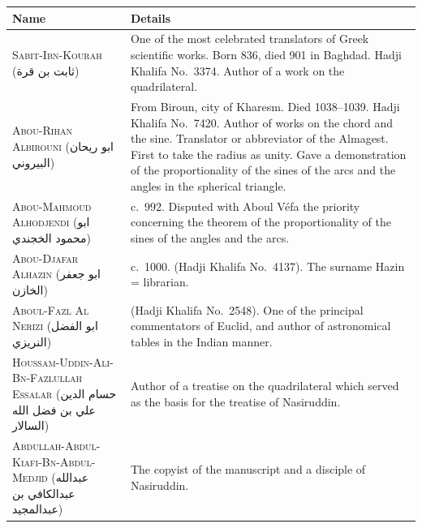 \documentclass[11pt,a4paper]{article}
\theoremstyle{plain}
\theoremstyle{definition}
\theoremstyle{remark}
\newcommand{\ar}[1]{{\arabicfont\beginR #1\endR}}
\begin{document}
\begin{center}
\begin{longtable}{lp{9cm}}
\toprule
\textbf{Name} & \textbf{Details} \\
\midrule
\endhead

\textsc{Sabit-Ibn-Kourah} (\ar{ثابت بن قرة}) & One of the most celebrated translators of Greek scientific works. Born 836, died 901 in Baghdad. Hadji Khalifa No.~3374. Author of a work on the quadrilateral. \\
\addlinespace[0.2cm]

\textsc{Abou-Rihan Albirouni} (\ar{ابو ريحان البيروني}) & From Biroun, city of Kharesm. Died 1038--1039. Hadji Khalifa No.~7420. Author of works on the chord and the sine. Translator or abbreviator of the Almagest. First to take the radius as unity. Gave a demonstration of the proportionality of the sines of the arcs and the angles in the spherical triangle. \\
\addlinespace[0.2cm]

\textsc{Abou-Mahmoud Alhodjendi} (\ar{ابو محمود الخجندي}) & c.~992. Disputed with Aboul V\'efa the priority concerning the theorem of the proportionality of the sines of the angles and the arcs. \\
\addlinespace[0.2cm]

\textsc{Abou-Djafar Alhazin} (\ar{ابو جعفر الخازن}) & c.~1000. (Hadji Khalifa No.~4137). The surname Hazin = librarian. \\
\addlinespace[0.2cm]

\textsc{Aboul-Fazl Al Nerizi} (\ar{ابو الفضل النريزي}) & (Hadji Khalifa No.~2548). One of the principal commentators of Euclid, and author of astronomical tables in the Indian manner. \\
\addlinespace[0.2cm]

\textsc{Houssam-Uddin-Ali-Bn-Fazlullah Essalar} (\ar{حسام الدين علي بن فضل الله السالار}) & Author of a treatise on the quadrilateral which served as the basis for the treatise of Nasiruddin. \\
\addlinespace[0.2cm]

\textsc{Abdullah-Abdul-Kiafi-Bn-Abdul-Medjid} (\ar{عبدالله عبدالكافي بن عبدالمجيد}) & The copyist of the manuscript and a disciple of Nasiruddin. \\

\bottomrule
\end{longtable}
\end{center}

\clearpage
\end{document}
